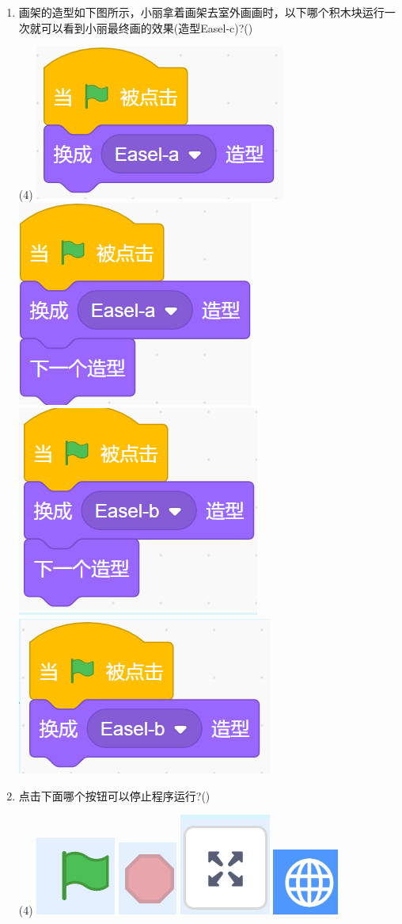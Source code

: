 \documentclass[10pt, a4paper]{article}
\begin{document}
\begin{enumerate}
        \item  画架的造型如下图所示，小丽拿着画架去室外画画时，以下哪个积木块运行一次就可以看到小丽最终画的效果(造型Easel-c)?(\qquad)
        \begin{tasks}(4)
            \task \includegraphics[width=.15\textwidth]{15a.png}
            \task \includegraphics[width=.11\textwidth]{15b.png}
            \task \includegraphics[width=.11\textwidth]{15c.png}
            \task \includegraphics[width=.15\textwidth]{15d.png}
        \end{tasks}
        
        \item 点击下面哪个按钮可以停止程序运行?(\qquad)
        \begin{tasks}(4)
            \task \includegraphics[width=.05\textwidth]{16a.png}
            \task \includegraphics[width=.05\textwidth]{16b.png}
            \task \includegraphics[width=.05\textwidth]{16c.png}
            \task \includegraphics[width=.05\textwidth]{16d.png}
        \end{tasks}


\end{enumerate}
\end{document}
